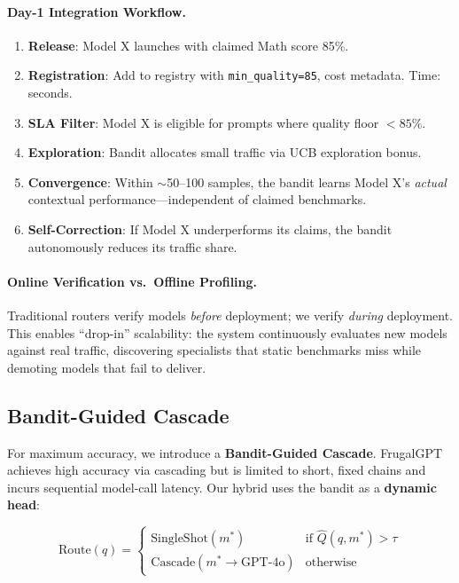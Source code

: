 \paragraph{Day-1 Integration Workflow.}
\begin{enumerate}[leftmargin=*,nosep]
    \item \textbf{Release}: Model X launches with claimed Math score 85\%.
    \item \textbf{Registration}: Add to registry with \texttt{min\_quality=85}, cost metadata. Time: seconds.
    \item \textbf{SLA Filter}: Model X is eligible for prompts where quality floor $<85\%$.
    \item \textbf{Exploration}: Bandit allocates small traffic via UCB exploration bonus.
    \item \textbf{Convergence}: Within $\sim$50--100 samples, the bandit learns Model X's \emph{actual} contextual performance---independent of claimed benchmarks.
    \item \textbf{Self-Correction}: If Model X underperforms its claims, the bandit autonomously reduces its traffic share.
\end{enumerate}

\paragraph{Online Verification vs.\ Offline Profiling.} Traditional routers verify models \emph{before} deployment; we verify \emph{during} deployment. This enables ``drop-in'' scalability: the system continuously evaluates new models against real traffic, discovering specialists that static benchmarks miss while demoting models that fail to deliver.

\subsection{Bandit-Guided Cascade}
\label{sec:hybrid}

For maximum accuracy, we introduce a \textbf{Bandit-Guided Cascade}. FrugalGPT~\cite{chen2023frugalgpt} achieves high accuracy via cascading but is limited to short, fixed chains and incurs sequential model-call latency. Our hybrid uses the bandit as a \textbf{dynamic head}:

\begin{equation}
\text{Route}(q) = 
\begin{cases}
\text{SingleShot}(m^*) & \text{if } \hat{Q}(q, m^*) > \tau \\
\text{Cascade}(m^* \to \text{GPT-4o}) & \text{otherwise}
\end{cases}
\label{eq:hybrid}
\end{equation}

